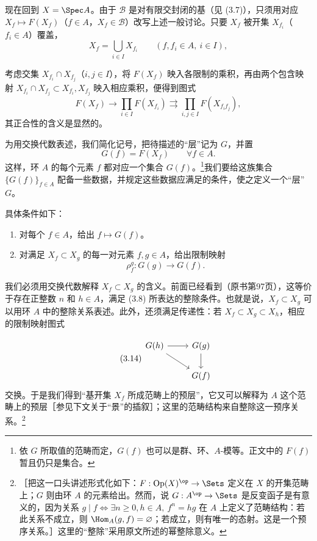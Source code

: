 现在回到 $X=\Spec A$。由于 $\mathcal B$ 是对有限交封闭的基（见 (3.7)），只须用对应 $X_f\mapsto F(X_f)$（$f\in A$，$X_f\in\mathcal B$）改写上述一般讨论。只要 $X_f$ 被开集 $X_{f_i}$（$f_i\in A$）覆盖，
\begin{equation}\tag{3.11}
X_f=\bigcup_{i\in I}X_{f_i}\qquad(f,f_i\in A,\ i\in I),
\end{equation}

考虑交集 $X_{f_i}\cap X_{f_j}$（$i,j\in I$），将 $F(X_f)$ 映入各限制的乘积，再由两个包含映射 $X_{f_i}\cap X_{f_j}\subset X_{f_i},X_{f_j}$ 映入相应乘积，便得到图式
\begin{equation}\tag{3.12}
F(X_f)\longrightarrow\prod_{i\in I}F(X_{f_i})
\rightrightarrows\prod_{i,j\in I}F(X_{f_if_j}),
\end{equation}
其正合性的含义是显然的。

为用交换代数表述，我们简化记号，把待描述的“层”记为 $G$，并置
\begin{equation}\tag{3.13}
G(f)=F(X_f)\qquad\forall f\in A.
\end{equation}
这样，环 $A$ 的每个元素 $f$ 都对应一个集合 $G(f)$。\footnote{依 $G$ 所取值的范畴而定，$G(f)$ 也可以是群、环、$A$-模等。正文中的 $F(f)$ 暂且仍只是集合。}我们要给这族集合 $\{G(f)\}_{f\in A}$ 配备一些数据，并规定这些数据应满足的条件，使之定义一个“层” $G$。

具体条件如下：
\begin{enumerate}[label=\alph*)]
\item 对每个 $f\in A$，给出 $f\mapsto G(f)$。
\item 对满足 $X_f\subset X_g$ 的每一对元素 $f,g\in A$，给出限制映射
\[
\rho_f^g:G(g)\longrightarrow G(f).
\]
\end{enumerate}
我们必须用交换代数解释 $X_f\subset X_g$ 的含义。前面已经看到（原书第97页），这等价于存在正整数 $n$ 和 $h\in A$，满足 (3.8) 所表达的整除条件。也就是说，$X_f\subset X_g$ 可以用环 $A$ 中的整除关系表述。此外，还须满足传递性：若 $X_f\subset X_g\subset X_h$，相应的限制映射图式

\begin{equation}\tag{3.14}
\begin{tikzcd}[ampersand replacement=\&]
G(h)\arrow[r]\arrow[dr] \&G(g)\arrow[d]\\
\&G(f)
\end{tikzcd}
\end{equation}
交换。于是我们得到“基开集 $X_f$ 所成范畴上的预层”，它又可以解释为 $A$ 这个范畴上的预层［参见下文关于“景”的插叙］；这里的范畴结构来自整除这一预序关系。\footnote{［把这一口头讲述形式化如下：$F:\operatorname{Op}(X)^{\op}\to\Sets$ 定义在 $X$ 的开集范畴上；$G$ 则由环 $A$ 的元素给出。然而，说 $G:A^{\op}\to\Sets$ 是反变函子是有意义的，因为关系 $g\mid f\iff\exists n\geq0,h\in A,\ f^n=hg$ 在 $A$ 上定义了范畴结构：若此关系不成立，则 $\Hom_A(g,f)=\varnothing$；若成立，则有唯一的态射。这是一个预序关系。］这里的“整除”采用原文所述的幂整除意义。}

